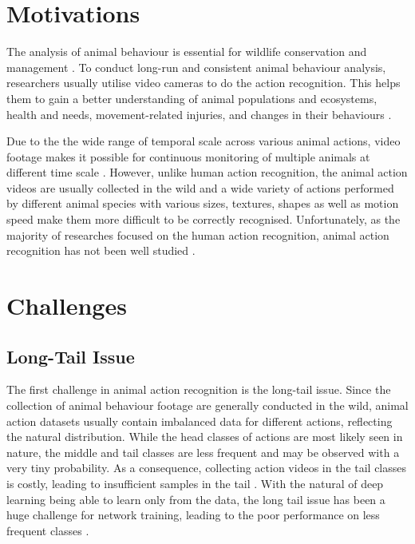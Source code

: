 \section{Motivations}
The analysis of animal behaviour is essential for wildlife conservation and management \parencite{Greggor2019, singh2020animal}. To conduct long-run and consistent animal behaviour analysis, researchers usually utilise video cameras to do the action recognition. This helps them to gain a better understanding of animal populations and ecosystems, health and needs, movement-related injuries, and changes in their behaviours \parencite{ng2022animal, Giersberg:2022aa, 8259762}.

Due to the the wide range of temporal scale across various animal actions, video footage makes it possible for continuous monitoring of multiple animals at different time scale \parencite{ANDERSON201418}. However, unlike human action recognition, the animal action videos are usually collected in the wild and a wide variety of actions performed by different animal species with various sizes, textures, shapes as well as motion speed make them more difficult to be correctly recognised. Unfortunately, as the majority of researches focused on the human action recognition, animal action recognition has not been well studied \parencite{mondal2023msqnet}.

\section{Challenges}
\subsection{Long-Tail Issue}
The first challenge in animal action recognition is the long-tail issue. Since the collection of animal behaviour footage are generally conducted in the wild, animal action datasets usually contain imbalanced data for different actions, reflecting the natural distribution. While the head classes of actions are most likely seen in nature, the middle and tail classes are less frequent and may be observed with a very tiny probability. As a consequence, collecting action videos in the tail classes is costly, leading to insufficient samples in the tail \parencite{ng2022animal, perrett2023use}. With the natural of deep learning being able to learn only from the data, the long tail issue has been a huge challenge for network training, leading to the poor performance on less frequent classes \parencite{cao2019learning, zhang2021videolt}.

